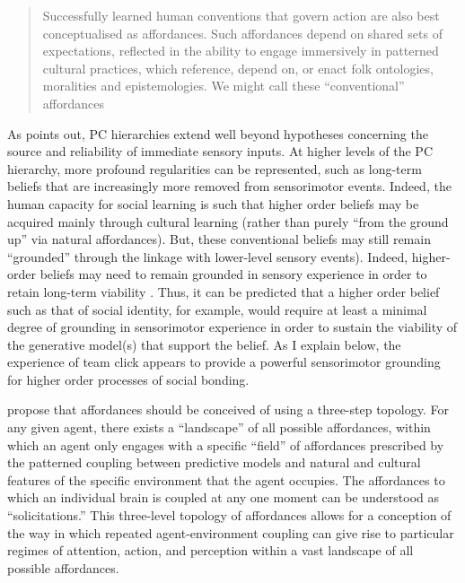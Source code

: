\begin{CJK}{UTF8}{gbsn}
\begin{quote}
  Successfully learned human conventions that govern action are also best conceptualised as affordances. Such affordances depend on shared sets of expectations, reflected in the ability to engage immersively in patterned cultural practices, which reference, depend on, or enact folk ontologies, moralities and epistemologies. We might call these ``conventional'' affordances \citep[7]{Ramstead2016}
\end{quote}

As \textcite[906]{Pezzulo2014} points out, PC hierarchies extend well beyond hypotheses concerning the source and reliability of immediate sensory inputs. At higher levels of the PC hierarchy, more profound regularities can be represented, such as long-term beliefs that are increasingly more removed from sensorimotor events. Indeed, the human capacity for social learning is such that higher order beliefs may be acquired mainly through cultural learning (rather than purely ``from the ground up'' via natural affordances). But, these conventional beliefs may still remain ``grounded'' through the linkage with lower-level sensory events).  Indeed, higher-order beliefs may need to remain grounded in sensory experience in order to retain long-term viability \citep{Ramstead2016}.  Thus, it can be predicted that a higher order belief such as that of social identity, for example, would require at least a minimal degree of grounding in sensorimotor experience in order to sustain the viability of the generative model(s) that support the belief.  As I explain below, the experience of team click appears to provide a powerful sensorimotor grounding for higher order processes of social bonding.

\textcite{Bruineberg2014} propose that affordances should be conceived of using a three-step topology. For any given agent, there exists a ``landscape'' of all possible affordances, within which an agent only engages with a specific ``field'' of affordances prescribed by the patterned coupling between predictive models and natural and cultural features of the specific environment that the agent occupies. The affordances to which an individual brain is coupled at any one moment can be understood as ``solicitations.''  This three-level topology of affordances allows for a conception of the way in which repeated agent-environment coupling can give rise to particular regimes of attention, action, and perception within a vast landscape of all possible affordances.


\end{CJK}
